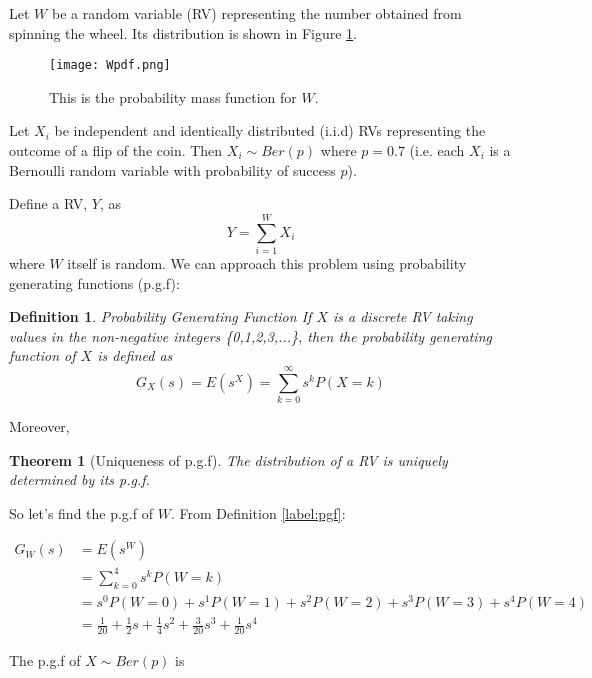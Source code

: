 \documentclass{article}
\newtheorem{definition}{Definition}[section]
\newtheorem{theorem}{Theorem}[section]
\begin{document}
\begin{flushleft}
Let $W$ be a random variable (RV) representing the number obtained from spinning the wheel. Its distribution is shown in Figure \ref{fig:Wpf}. \newline

\begin{figure}
    \centering
    \texttt{[image: Wpdf.png]}
    \caption{This is the probability mass function for $W$.}
    \label{fig:Wpf}
\end{figure}

Let $X_i$ be independent and identically distributed (i.i.d) RVs representing the outcome of a flip of the coin. Then $X_i \sim Ber(p)$ where $p=0.7$ (i.e. each $X_i$ is a Bernoulli random variable with probability of success $p$).\newline

Define a RV, $Y$, as
$$Y = \sum_{i=1}^W X_i$$
where $W$ itself is random. We can approach this problem using probability generating functions (p.g.f):\newline

\begin{definition}{Probability Generating Function}{\label{label:pgf}}
If $X$ is a discrete RV taking values in the non-negative integers \{0,1,2,3,...\}, then the probability generating function of $X$ is defined as \cite{wikipediapgf}
$$G_X(s) = E(s^X) = \sum_{k=0}^{\infty} s^k P(X=k)$$
\end{definition}

Moreover,

\begin{theorem}[Uniqueness of p.g.f]{\label{thm:pgf}}
The distribution of a RV is uniquely determined by its p.g.f.
\end{theorem}

So let's find the p.g.f of $W$. From Definition \ref{label:pgf}:

\begin{equation} \label{eq1}
\begin{split}
G_W(s) & = E(s^W) \\
& = \sum_{k=0}^4 s^k P(W=k) \\
& = s^0 P(W=0) + s^1 P(W=1) + s^2 P(W=2) + s^3 P(W=3) + s^4 P(W=4) \\
& = \frac{1}{20} + \frac{1}{2}s + \frac{1}{4}s^2 + \frac{3}{20}s^3 + \frac{1}{20}s^4
\end{split}
\end{equation}

The p.g.f of $X \sim Ber(p)$ is


\end{flushleft}
\end{document}
